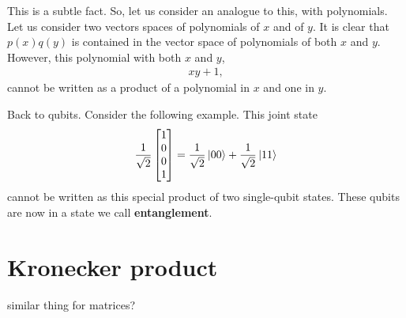 \documentclass[a4paper,11pt]{article}
\numberwithin{equation}{section}
\theoremstyle{definition}
\newcommand{\f}[2]{\frac{#1}{#2}}
\begin{document}
This is a subtle fact. So, let us consider an analogue to this, with polynomials. Let us consider two vectors spaces of polynomials of $x$ and of $y$. It is clear that $p(x)q(y)$ is contained in the vector space of polynomials of both $x$ and $y$. However, this polynomial with both $x$ and $y$,
\begin{align*}
xy + 1,
\end{align*}
cannot be written as a product of a polynomial in $x$ and one in $y$. 

Back to qubits. Consider the following example. This joint state
\begin{align*}
\frac{1}{\sqrt{2}}\begin{bmatrix}
1\\0\\0\\1
\end{bmatrix} = \f{1}{\sqrt{2}}\ket{00} + \f{1}{\sqrt{2}}\ket{11}
\end{align*}
cannot be written as this special product of two single-qubit states. These qubits are now in a state we call \textbf{entanglement}. 

\section{Kronecker product}
similar thing for matrices?
\end{document}
